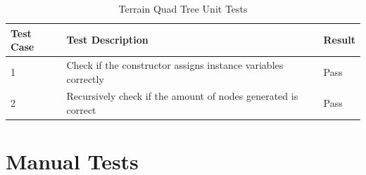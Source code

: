 \documentclass[a4paper,10pt]{report}
\begin{document}
\begin{table}[ht!]
\centering
\caption{Terrain Quad Tree Unit Tests}
\label{quadtree-unit-tests}
\begin{tabular}{lll}
\hline
Test Case & Test Description                                              & Result                       \\ \hline
1         & Check if the constructor assigns instance variables correctly & \cellcolor[HTML]{67FD9A}Pass \\
2         & Recursively check if the amount of nodes generated is correct & \cellcolor[HTML]{67FD9A}Pass
\end{tabular}
\end{table}
\clearpage
\section{Manual Tests}
\end{document}
